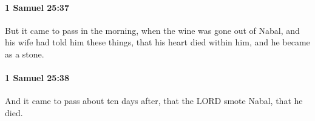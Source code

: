 		\paragraph{1 Samuel 25:37} %
			\label{1SAMUEL-25-37}

			But it came to pass in the morning, when the wine was gone out of Nabal, and his wife had told him these things, that his heart died within him, and he became as a stone.


		\paragraph{1 Samuel 25:38} %
			\label{1SAMUEL-25-38}

			And it came to pass about ten days after, that the LORD smote Nabal, that he died.


